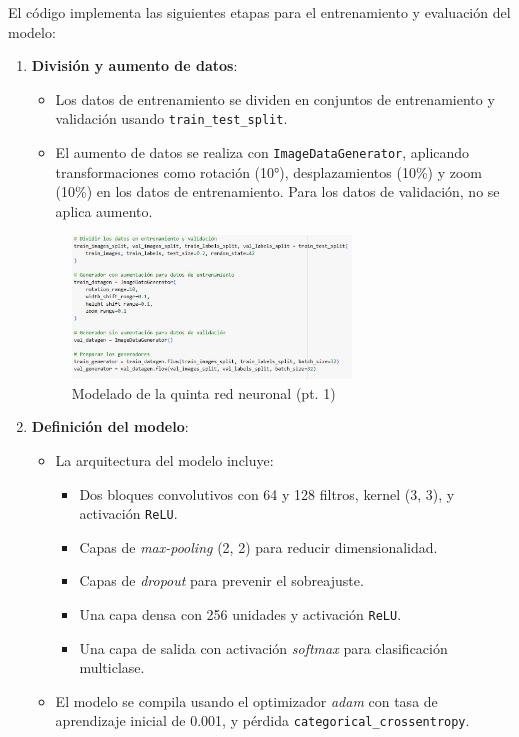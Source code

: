 El código implementa las siguientes etapas para el entrenamiento y evaluación del modelo:

\begin{enumerate}
	\item \textbf{División y aumento de datos}:
	\begin{itemize}
		\item Los datos de entrenamiento se dividen en conjuntos de entrenamiento y validación usando \texttt{train\_test\_split}.
		\item El aumento de datos se realiza con \texttt{ImageDataGenerator}, aplicando transformaciones como rotación (10°), desplazamientos (10\%) y zoom (10\%) en los datos de entrenamiento. Para los datos de validación, no se aplica aumento.
	\end{itemize}
	
	\begin{figure}[H]
		\centering
		\includegraphics[width=0.7\textwidth]{imgs/model-1-red5.JPG}
		\caption{Modelado de la quinta red neuronal (pt. 1)}
		\label{fig:model-1-red5}
	\end{figure}
	
	\item \textbf{Definición del modelo}:
	\begin{itemize}
		\item La arquitectura del modelo incluye:
		\begin{itemize}
			\item Dos bloques convolutivos con 64 y 128 filtros, kernel (3, 3), y activación \texttt{ReLU}.
			\item Capas de \textit{max-pooling} (2, 2) para reducir dimensionalidad.
			\item Capas de \textit{dropout} para prevenir el sobreajuste.
			\item Una capa densa con 256 unidades y activación \texttt{ReLU}.
			\item Una capa de salida con activación \textit{softmax} para clasificación multiclase.
		\end{itemize}
		\item El modelo se compila usando el optimizador \textit{adam} con tasa de aprendizaje inicial de 0.001, y pérdida \texttt{categorical\_crossentropy}.
	\end{itemize}
	

\end{enumerate}
